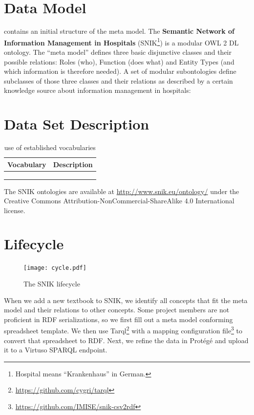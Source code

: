 \documentclass[sw]{iosart2x}
\renewcommand{\citet}{\cite}%
\begin{document}
\section{Data Model}\label{sec:architecture}
\citet{domaene} contains an initial structure of the meta model.
The \textbf{Semantic Network of Information Management in Hospitals} (SNIK\footnote{Hospital means \enquote{Krankenhaus} in German.}) is a modular OWL 2 DL ontology.
The \enquote{meta model} defines three basic disjunctive classes and their possible relations: Roles (who), Function (does what) and Entity Types (and which information is therefore needed).
A set of modular subontologies define subclasses of those three classes and their relations as described by a certain knowledge source about information management in hospitals:

\section{Data Set Description}\label{sec:dsd}
\begin{table}
\caption{use of established vocabularies}
\label{tab:templates}
\begin{tabulary}{\textwidth}{lL}
\toprule
\textbf{Vocabulary}	&\textbf{Description}\\
\midrule
&\\
&\\
&\\
\bottomrule
\end{tabulary}
\end{table}

The SNIK ontologies are available at \url{http://www.snik.eu/ontology/} under the Creative Commons Attribution-NonCommercial-ShareAlike 4.0 International license.

\section{Lifecycle}\label{sec:application}

\begin{figure}[ht]
\caption{The SNIK lifecycle}
\label{fig:lifecycle}
\texttt{[image: cycle.pdf]}
\end{figure}

When we add a new textbook to SNIK, we identify all concepts that fit the meta model and their relations to other concepts.
Some project members are not proficient in RDF serializations, so we first fill out a meta model conforming spreadsheet template.
We then use Tarql\footnote{\url{https://github.com/cygri/tarql}} with a mapping configuration file\footnote{\url{https://github.com/IMISE/snik-csv2rdf}} to convert that spreadsheet to RDF.
Next, we refine the data in Protégé and upload it to a Virtuso SPARQL endpoint.
\end{document}
